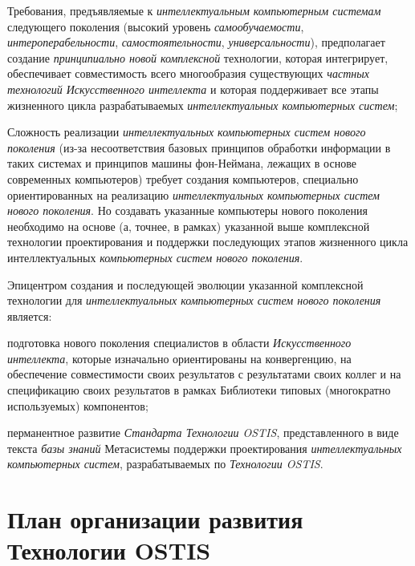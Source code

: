 \begin{textitemize}
	\item
	Требования, предъявляемые к \textit{интеллектуальным компьютерным системам} следующего поколения (высокий уровень \textit{самообучаемости}, \textit{интероперабельности}, \textit{самостоятельности}, \textit{универсальности}), предполагает создание \textit{принципиально новой комплексной} технологии, которая интегрирует, обеспечивает совместимость всего многообразия существующих \textit{частных технологий Искусственного интеллекта} и которая поддерживает все этапы жизненного цикла разрабатываемых \textit{интеллектуальных компьютерных систем};
	\item
	Сложность реализации \textit{интеллектуальных компьютерных систем нового поколения} (из-за несоответствия базовых принципов обработки информации в таких системах и принципов машины фон-Неймана, лежащих в основе современных компьютеров) требует создания компьютеров, специально ориентированных на реализацию \textit{интеллектуальных компьютерных систем нового поколения}. Но создавать указанные компьютеры нового поколения необходимо на основе (а, точнее, в рамках) указанной выше комплексной технологии проектирования и поддержки последующих этапов жизненного цикла интеллектуальных \textit{компьютерных систем нового поколения}.
	\item
	Эпицентром создания и последующей эволюции указанной комплексной технологии для \textit{интеллектуальных компьютерных систем нового поколения} является:
	\begin{textitemize}
		\item подготовка нового поколения специалистов в области \textit{Искусственного интеллекта}, которые изначально ориентированы на конвергенцию, на обеспечение совместимости своих результатов с результатами своих коллег и на спецификацию своих результатов в рамках Библиотеки типовых (многократно используемых) компонентов;
		\item перманентное развитие \textit{Стандарта Технологии OSTIS}, представленного в виде  текста \textit{базы знаний} Метасистемы поддержки проектирования \textit{интеллектуальных компьютерных систем}, разрабатываемых по \textit{Технологии OSTIS}.
	\end{textitemize}
\end{textitemize}

\section*{План организации развития Технологии OSTIS}
\label{concl_ostis_plan}

